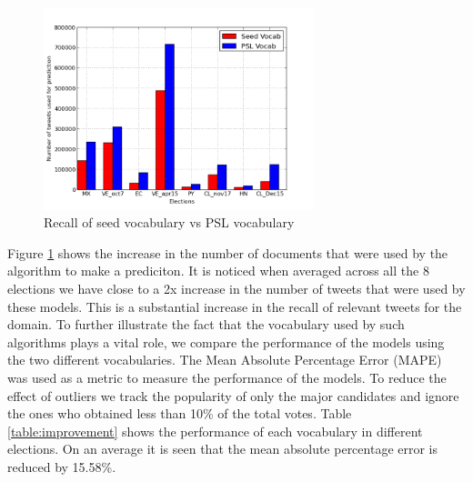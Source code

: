 \begin{figure}[Ht]
	\centering
	\includegraphics[width=0.7\textwidth, height=0.3\textheight]{support_files/Recall.png}
\vspace{-1em}
	\caption{Recall of seed vocabulary vs PSL vocabulary}
	\label{fig:recall}
	\vspace{-1em}
\end{figure}
Figure \ref{fig:recall} shows the increase in the number of documents that were used by the algorithm to make a prediciton.
It is noticed when averaged across all the 8 elections we have close to a 2x increase in the number of tweets that were used by these models.
This is a substantial increase in the recall of relevant tweets for the domain.
To further illustrate the fact that the vocabulary used by such algorithms plays a vital role, we compare the performance of the models using the two different vocabularies.
The Mean Absolute Percentage Error (MAPE) was used as a metric to measure the performance of the models. 
To reduce the effect of outliers we track the popularity of only the major candidates and ignore the ones who obtained less than 10\% of the total votes.
Table \ref{table:improvement} shows the performance of each vocabulary in different elections. 
On an average it is seen that the mean absolute percentage error is reduced by 15.58\%.
